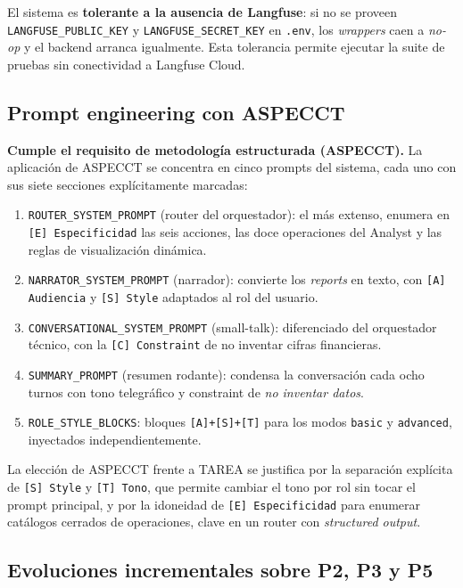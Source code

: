 El sistema es \textbf{tolerante a la ausencia de Langfuse}: si no
se proveen \texttt{LANGFUSE\_PUBLIC\_KEY} y \texttt{LANGFUSE\_SECRET\_KEY}
en \texttt{.env}, los \textit{wrappers} caen a \textit{no-op} y el
backend arranca igualmente. Esta tolerancia permite ejecutar la
suite de pruebas sin conectividad a Langfuse Cloud.

\subsection{Prompt engineering con ASPECCT}
\label{subsec:aspect}

\textbf{Cumple el requisito de metodología estructurada (ASPECCT).}
La aplicación de ASPECCT se concentra en cinco prompts del sistema,
cada uno con sus siete secciones explícitamente marcadas:

\begin{enumerate}[leftmargin=1.5em,itemsep=0.2em]
  \item \texttt{ROUTER\_SYSTEM\_PROMPT} (router del orquestador): el
        más extenso, enumera en \texttt{[E] Especificidad} las seis
        acciones, las doce operaciones del Analyst y las reglas de
        visualización dinámica.
  \item \texttt{NARRATOR\_SYSTEM\_PROMPT} (narrador): convierte los
        \textit{reports} en texto, con \texttt{[A] Audiencia} y
        \texttt{[S] Style} adaptados al rol del usuario.
  \item \texttt{CONVERSATIONAL\_SYSTEM\_PROMPT} (small-talk):
        diferenciado del orquestador técnico, con la
        \texttt{[C] Constraint} de no inventar cifras financieras.
  \item \texttt{SUMMARY\_PROMPT} (resumen rodante): condensa la
        conversación cada ocho turnos con tono telegráfico y
        constraint de \textit{no inventar datos}.
  \item \texttt{ROLE\_STYLE\_BLOCKS}: bloques \texttt{[A]+[S]+[T]}
        para los modos \texttt{basic} y \texttt{advanced},
        inyectados independientemente.
\end{enumerate}

La elección de ASPECCT frente a TAREA se justifica por la
separación explícita de \texttt{[S] Style} y \texttt{[T] Tono}, que
permite cambiar el tono por rol sin tocar el prompt principal, y por
la idoneidad de \texttt{[E] Especificidad} para enumerar catálogos
cerrados de operaciones, clave en un router con \textit{structured
output}.

\subsection{Evoluciones incrementales sobre P2, P3 y P5}
\label{subsec:evoluciones}

